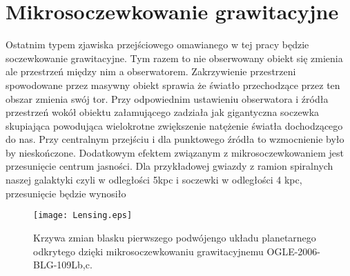 \documentclass[polish,12pt]{pracamgr}
\begin{document}
\section{Mikrosoczewkowanie grawitacyjne}
Ostatnim typem zjawiska przejściowego omawianego w tej pracy będzie soczewkowanie grawitacyjne. Tym razem to nie obserwowany obiekt się zmienia ale przestrzeń między nim a obserwatorem. Zakrzywienie przestrzeni spowodowane przez masywny obiekt sprawia że światło przechodzące przez ten obszar zmienia swój tor. Przy odpowiednim ustawieniu obserwatora i źródła przestrzeń wokół obiektu załamującego zadziała jak gigantyczna soczewka skupiająca powodująca wielokrotne zwiększenie natężenie światła dochodzącego do nas. Przy centralnym przejściu i dla punktowego źródła to wzmocnienie było by nieskończone. Dodatkowym efektem związanym z mikrosoczewkowaniem jest przesunięcie centrum jasności. Dla przykładowej gwiazdy z ramion spiralnych naszej galaktyki czyli w odległości 5kpc i soczewki w odległości 4 kpc, przesunięcie będzie wynosiło   %
\begin{figure}[!h]
\centering
\texttt{[image: Lensing.eps]}
\caption{Krzywa zmian blasku pierwszego podwójengo układu planetarnego odkrytego dzięki mikrosoczewkowaniu grawitacyjnemu  OGLE-2006-BLG-109Lb,c.}%
\label{ OGLE-2006-BLG-109Lb,c}
\end{figure}












  





\end{document}
